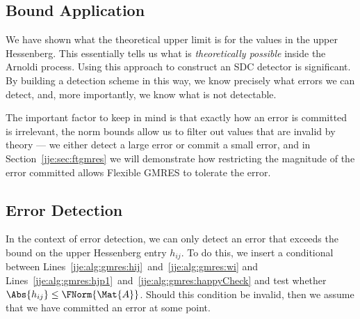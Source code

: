\subsection{Bound Application}


We have shown what the theoretical upper limit is for the values in the upper
Hessenberg. This essentially tells us what is \emph{theoretically possible}
inside the Arnoldi process. Using this approach to construct an
SDC detector is significant. By building a detection scheme in this way, we know
precisely what errors we can detect, and, more importantly, we know what is not
detectable. 

The important factor to keep in mind is that exactly how an error is
committed is irrelevant, the norm bounds allow us to filter out values
that are invalid by theory --- we either detect a
large error or commit a small error, and in Section~\ref{jje:sec:ftgmres} we
will demonstrate how restricting the magnitude of the error committed allows
Flexible GMRES to tolerate the error.



\subsection{Error Detection}


In the context of error detection, we can only detect an error that exceeds the
bound on the upper Hessenberg entry $h_{ij}$. To do this, we insert a
conditional between
Lines~\ref{jje:alg:gmres:hij}~and~\ref{jje:alg:gmres:wi} and 
Lines~\ref{jje:alg:gmres:hjp1}~and~\ref{jje:alg:gmres:happyCheck}
 and test
whether $\Abs{h_{ij}} \leq \FNorm{\Mat{A}}$. Should this condition be invalid, then we assume that we have committed an error 
at some point.






